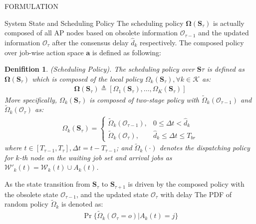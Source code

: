 \documentclass[10pt, conference, letterpaper]{IEEEtran}
\newtheorem{definition}{Denifition}
\renewcommand{\vec}{\mathbf}
\DeclarePairedDelimiter\set\{\}
\newcommand{\apSet}{\mathcal{K}}
\newcommand{\wSet}{\mathcal{W}}
\newcommand{\Stat}{\mathbf{S}}
\newcommand{\Obsv}{\mathcal{O}}
\newcommand{\Policy}{\mathbf{\Omega}}
\begin{document}
\begin{section}{FORMULATION}
\begin{subsection}{System State and Scheduling Policy}
            The scheduling policy $\vec{\Omega}(\Stat_\tau)$ is actually composed of all AP nodes based on obsolete information $\Obsv_{\tau-1}$ and the updated information $\Obsv_{\tau}$ after the consensus delay $\hat{d}_k$ respectively. The composed policy over job-wise action space $\vec{a}$ is defined as following:
            \begin{definition}(Scheduling Policy).
                The scheduling policy over $\Stat\tau$ is defined as $\Policy(\Stat_\tau)$ which is composed of the local policy $\Omega_k(\Stat_\tau), \forall k\in\apSet$ as:
                \begin{align}
                    \vec{\Omega}(\Stat_\tau) \triangleq [\Omega_1(\Stat_\tau), \dots, \Omega_K(\Stat_\tau)]
                \end{align}
                More specifically, $\Omega_k(\Stat_\tau)$ is composed of two-stage policy with $\tilde{\Omega}_k(\Obsv_{\tau-1})$ and $\tilde{\Omega}_k(\Obsv_{\tau})$ as:
                \begin{align}
                    \Omega_k(\Stat_\tau) = 
                    \begin{cases}
                        \tilde{\Omega}_k(\Obsv_{\tau-1}), & 0 \leq \Delta{t} < \hat{d}_k
                        \\
                        \tilde{\Omega}_k(\Obsv_{\tau}), & \hat{d}_k \leq \Delta{t} \leq T_{br}
                    \end{cases}
                \end{align}
                where $t\in[T_{\tau-1}, T_{\tau}] ,\Delta{t} = t - T_{\tau-1}$; and $\tilde{\Omega}_k(\cdot)$ denotes the dispatching policy for $k$-th node on the waiting job set and arrival jobs as $\wSet'_{k}(t)=\wSet_{k}(t) \cup A_k(t)$.
            \end{definition}

            As the state transition from $\Stat_{\tau}$ to $\Stat_{\tau+1}$ is driven by the composed policy with the obsolete state $\Obsv_{\tau-1}$, and the updated state $\Obsv_{\tau}$ with delay
            The PDF of random policy $\tilde{\Omega}_k$ is denoted as:
            \begin{align}
                \Pr\{\tilde{\Omega}_k(\Obsv_\tau=o)|A_k(t)=j\}
            \end{align}
        \end{subsection}


\end{section}
\end{document}
